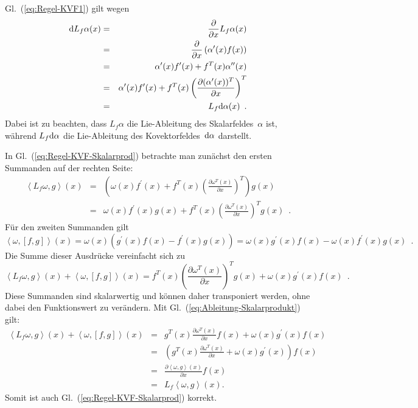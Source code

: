 \begin{svmultproof2}
Gl.~(\ref{eq:Regel-KVF1}) gilt wegen 
\begin{eqnarray*}
{\mathrm{d}} L_{f}\alpha(x) & = & \frac{\partial}{\partial x}L_{f}\alpha(x)\\
 & = & \frac{\partial}{\partial x}\left(\alpha^{\prime}(x)f(x)\right)\\
 & = & \alpha^{\prime}(x)f^{\prime}(x)+f^{T}(x)\alpha^{\prime\prime}(x)\\
 & = & \alpha^{\prime}(x)f^{\prime}(x)+f^{T}(x)\left(\frac{\partial(\alpha^{\prime}(x))^{T}}{\partial x}\right)^{T}\\
 & = & L_{f}{\mathrm{d}}\alpha(x)\enspace.
\end{eqnarray*}
Dabei ist zu beachten, dass $L_{f}\alpha$ die Lie-Ableitung des Skalarfeldes~$\alpha$
ist, während $L_{f}{\mathrm{d}}\alpha$ die Lie-Ableitung des Kovektorfeldes~${\mathrm{d}}\alpha$
darstellt. 

In Gl.~(\ref{eq:Regel-KVF-Skalarprod}) betrachte man zunächst den
ersten Summanden auf der rechten Seite: 
\begin{eqnarray*}
\left\langle L_{f}\omega,g\right\rangle (x) & = & \left(\omega(x)f^{\prime}(x)+f^{T}(x)\left(\frac{\partial\omega^{T}(x)}{\partial x}\right)^{T}\right)g(x)\\
 & = & \omega(x)f^{\prime}(x)g(x)+f^{T}(x)\left(\frac{\partial\omega^{T}(x)}{\partial x}\right)^{T}g(x)\enspace.
\end{eqnarray*}
Für den zweiten Summanden gilt 
\[
\left\langle \omega,[f,g]\right\rangle (x)=\omega(x)\left(g^{\prime}(x)f(x)-f^{\prime}(x)g(x)\right)=\omega(x)g^{\prime}(x)f(x)-\omega(x)f^{\prime}(x)g(x)\enspace.
\]
Die Summe dieser Ausdrücke vereinfacht sich zu 
\[
\left\langle L_{f}\omega,g\right\rangle (x)+\left\langle \omega,[f,g]\right\rangle (x)=f^{T}(x)\left(\frac{\partial\omega^{T}(x)}{\partial x}\right)^{T}g(x)+\omega(x)g^{\prime}(x)f(x)\enspace.
\]
Diese Summanden sind skalarwertig und können daher transponiert werden,
ohne dabei den Funktionswert zu verändern. Mit Gl.~(\ref{eq:Ableitung-Skalarprodukt})
gilt: 
\begin{eqnarray*}
\left\langle L_{f}\omega,g\right\rangle (x)+\left\langle \omega,[f,g]\right\rangle (x) & = & g^{T}(x)\frac{\partial\omega^{T}(x)}{\partial x}f(x)+\omega(x)g^{\prime}(x)f(x)\\
 & = & \left(g^{T}(x)\frac{\partial\omega^{T}(x)}{\partial x}+\omega(x)g^{\prime}(x)\right)f(x)\\
 & = & \frac{\partial\left\langle \omega,g\right\rangle (x)}{\partial x}f(x)\\
 & = & L_{f}\left\langle \omega,g\right\rangle (x).
\end{eqnarray*}
Somit ist auch Gl.~(\ref{eq:Regel-KVF-Skalarprod}) korrekt.
\end{svmultproof2}


